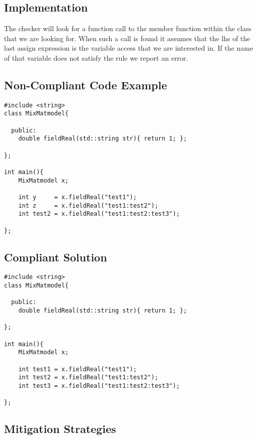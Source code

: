 \subsection{Implementation}
The checker will look for a function call to the member function within
the class that we are looking for. When such a call is found it assumes that
the lhs of the last assign expression is the variable access that we are interested in.
If the name of that variable does not satisfy the rule we report an error.

\subsection{Non-Compliant Code Example}


\begin{verbatim}
#include <string>
class MixMatmodel{

  public:
    double fieldReal(std::string str){ return 1; };

};

int main(){
    MixMatmodel x;

    int y     = x.fieldReal("test1");
    int z     = x.fieldReal("test1:test2");
    int test2 = x.fieldReal("test1:test2:test3");

};
\end{verbatim}

\subsection{Compliant Solution}


\begin{verbatim}
#include <string>
class MixMatmodel{

  public:
    double fieldReal(std::string str){ return 1; };

};

int main(){
    MixMatmodel x;

    int test1 = x.fieldReal("test1");
    int test2 = x.fieldReal("test1:test2");
    int test3 = x.fieldReal("test1:test2:test3");

};
\end{verbatim}

\subsection{Mitigation Strategies}
